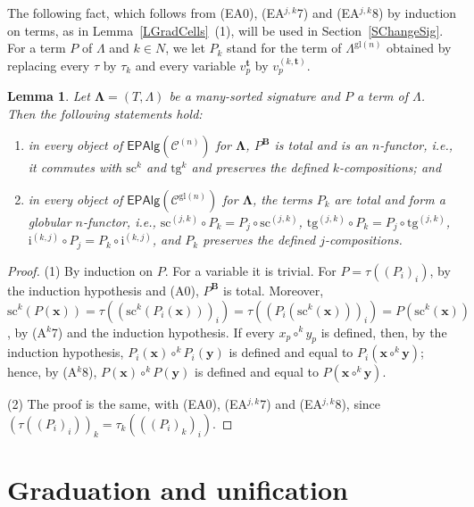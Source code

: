 \documentclass[a4paper,reqno]{amsart}
\newcommand{\sig}[1]{\mathbf{#1}}                %
\newcommand{\spec}[1]{\boldsymbol{\mathcal{#1}}} %
\newcommand{\gl}{\mathrm{gl}}
\newcommand{\src}{\mathrm{sc}}
\newcommand{\tgt}{\mathrm{tg}}
\newcommand{\ii}{\mathrm{i}}
\newcommand{\EPAlg}{\mathsf{EPAlg}}
\theoremstyle{plain}
\newtheorem{lemma}[theorem]{Lemma}
\theoremstyle{definition}
\begin{document}
The following fact, which follows from (EA0), (EA$^{j,k}$7) and (EA$^{j,k}$8) by induction on terms, as in Lemma~\ref{LGradCells}~(1), will be used in Section~\ref{SChangeSig}.
For a term $P$ of $\Lambda$ and $k\in N$, we let $P_{k}$ stand for the term of $\Lambda^{\gl(n)}$ obtained by replacing every $\tau$ by $\tau_{k}$ and every variable $v^{\mathbf{t}}_{p}$ by $v^{(k,\mathbf{t})}_{p}$.

\begin{lemma}\label{LTermFunctor}
Let $\sig{\Lambda}=(T,\Lambda)$ be a many-sorted signature and $P$ a term of $\Lambda$.
Then the following statements hold:
\begin{enumerate}
\item in every object of $\EPAlg(\spec{C}^{(n)})$ for $\sig{\Lambda}$, $P^{\mathbf{B}}$ is total and is an $n$-functor, i.e., it commutes with $\src^{k}$ and $\tgt^{k}$ and preserves the defined $k$-compositions; and
\item in every object of $\EPAlg(\spec{C}^{\gl(n)})$ for $\sig{\Lambda}$, the terms $P_{k}$ are total and form a globular $n$-functor, i.e., $\src^{(j,k)}\circ P_{k}=P_{j}\circ\src^{(j,k)}$, $\tgt^{(j,k)}\circ P_{k}=P_{j}\circ\tgt^{(j,k)}$, $\ii^{(k,j)}\circ P_{j}=P_{k}\circ\ii^{(k,j)}$, and $P_{k}$ preserves the defined $j$-compositions.
\end{enumerate}
\end{lemma}
\begin{proof}
(1) By induction on $P$.
For a variable it is trivial.
For $P=\tau((P_{i})_{i})$, by the induction hypothesis and (A0), $P^{\mathbf{B}}$ is total.
Moreover, $\src^{k}(P(\mathbf{x}))=\tau((\src^{k}(P_{i}(\mathbf{x})))_{i})=\tau((P_{i}(\src^{k}(\mathbf{x})))_{i})=P(\src^{k}(\mathbf{x}))$, by (A$^{k}$7) and the induction hypothesis.
If every $x_{p}\circ^{k}y_{p}$ is defined, then, by the induction hypothesis, $P_{i}(\mathbf{x})\circ^{k}P_{i}(\mathbf{y})$ is defined and equal to $P_{i}(\mathbf{x}\circ^{k}\mathbf{y})$; hence, by (A$^{k}$8), $P(\mathbf{x})\circ^{k}P(\mathbf{y})$ is defined and equal to $P(\mathbf{x}\circ^{k}\mathbf{y})$.

(2) The proof is the same, with (EA0), (EA$^{j,k}$7) and (EA$^{j,k}$8), since $(\tau((P_{i})_{i}))_{k}=\tau_{k}(((P_{i})_{k})_{i})$.
\end{proof}

\section{Graduation and unification}\label{SGraduation}
\end{document}

